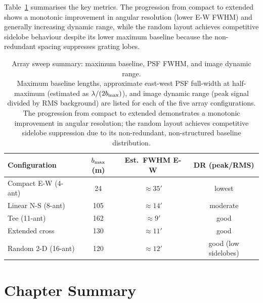 Table~\ref{tab:sweep-summary} summarises the key metrics. The progression from
compact to extended shows a monotonic improvement in angular resolution (lower
E-W FWHM) and generally increasing dynamic range, while the random layout
achieves competitive sidelobe behaviour despite its lower maximum baseline
because the non-redundant spacing suppresses grating lobes.

\begin{table}[H]
  \centering
  \caption[Array sweep summary: maximum baseline, PSF FWHM, and image dynamic range]{Array sweep summary: maximum baseline, PSF FWHM, and image dynamic range.\\[4pt]
  Maximum baseline lengths, approximate east-west PSF full-width at
  half-maximum (estimated as $\lambda/(2b_{\rm max})$), and image dynamic range
  (peak signal divided by RMS background) are listed for each of the five array
  configurations. The progression from compact to extended demonstrates a
  monotonic improvement in angular resolution; the random layout achieves
  competitive sidelobe suppression due to its non-redundant, non-structured
  baseline distribution.}
  \label{tab:sweep-summary}
  \renewcommand{\arraystretch}{1.25}
  \begin{tabular}{l c c c}
    \toprule
    \textbf{Configuration} & \textbf{$b_{\rm max}$ (m)} &
    \textbf{Est.\ FWHM E-W} & \textbf{DR (peak/RMS)} \\
    \midrule
    Compact E-W (4-ant)      & 24  & $\approx 35'$  & lowest \\
    Linear N-S (8-ant)       & 105 & $\approx 14'$  & moderate \\
    Tee (11-ant)              & 162 & $\approx  9'$  & good \\
    Extended cross            & 130 & $\approx 11'$  & good \\
    Random 2-D (16-ant)       & 120 & $\approx 12'$  & good (low sidelobes) \\
    \bottomrule
  \end{tabular}
\end{table}

\section{Chapter Summary}
\label{sec:pipeline-conclusion}

